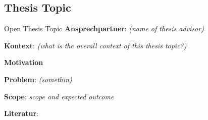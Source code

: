 \subsection{Thesis Topic}
\begin{frame}[allowframebreaks]{Open Thesis Topic}
	\textbf{Ansprechpartner}: \textit{(name of thesis advisor)}
	\begin{compactitem}
		\item \textbf{Kontext}: \textit{(what is the overall context of this thesis topic?)}
		\item \textbf{Motivation} 
		\item \textbf{Problem}: \textit{(somethin)}
		\item \textbf{Scope}: {\textit{scope and expected outcome}}
		\item \textbf{Literatur}: \cite{zeller2011failure,watling2021don} 
	\end{compactitem}
\end{frame}